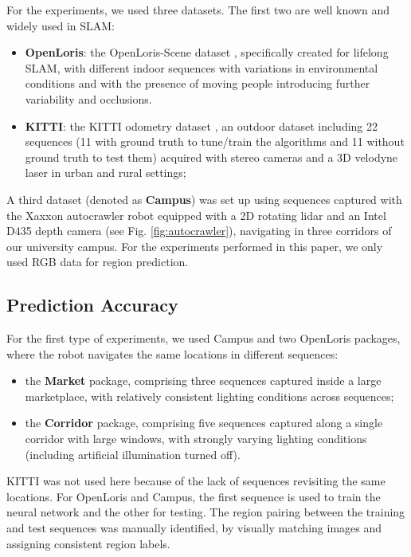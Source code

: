 \documentclass[letterpaper, 10 pt, conference]{ieeeconf}  %
\begin{document}
For the experiments, we used three datasets. The first two are well known and widely used in SLAM:\begin{itemize}
    \item \textbf{OpenLoris}: the OpenLoris-Scene dataset \cite{b16}, specifically created for lifelong SLAM, with different indoor sequences with variations in environmental conditions and with the presence of moving people introducing further variability and occlusions.
    \item \textbf{KITTI}: the KITTI odometry dataset \cite{b17}, an outdoor dataset including 22 sequences (11 with ground truth to tune/train the algorithms and 11 without ground truth to test them) acquired with stereo cameras and a 3D velodyne laser in urban and rural settings; 
\end{itemize}
A third dataset (denoted as \textbf{Campus}) was set up using sequences captured with the Xaxxon autocrawler robot \cite{b18} equipped with a 2D rotating lidar and an Intel D435 depth camera (see Fig. \ref{fig:autocrawler}), navigating in three corridors of our university campus. For the experiments performed in this paper, we only used RGB data for region prediction.




\subsection{Prediction Accuracy}
For the first type of experiments, we used Campus and two OpenLoris packages, where the robot navigates the same locations in different sequences: 
\begin{itemize}
    \item the \textbf{Market} package, comprising three sequences captured inside a large marketplace, with relatively consistent lighting conditions across sequences; 
    \item the \textbf{Corridor} package, comprising five sequences captured along a single corridor with large windows, with strongly varying lighting conditions (including artificial illumination turned off).
\end{itemize}



KITTI was not used here because of the lack of sequences revisiting the same locations. For OpenLoris and Campus, the first sequence is used to train the neural network and the other for testing. The region pairing between the training and test sequences was manually identified, by visually matching images and assigning consistent region labels.  
\end{document}
